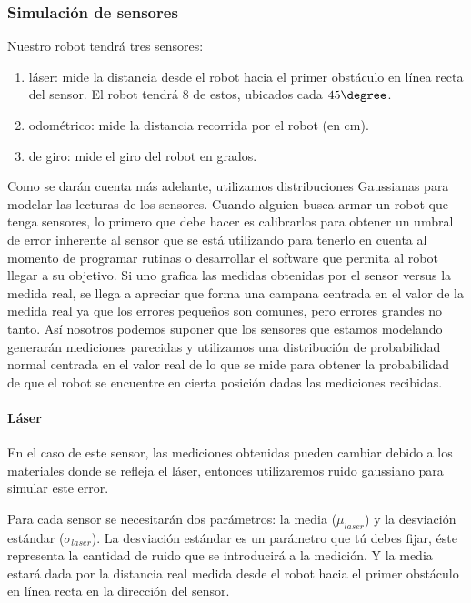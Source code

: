 \subsubsection{Simulación de sensores}

\noindent Nuestro robot tendrá tres sensores:

\begin{enumerate}
  \item láser: mide la distancia desde el robot hacia el primer obstáculo en línea recta del sensor. El robot tendrá 8 de estos, ubicados cada \(45\degree\).
  \item odométrico: mide la distancia recorrida por el robot (en cm).
  \item de giro: mide el giro del robot en grados.
\end{enumerate}

Como se darán cuenta más adelante, utilizamos distribuciones Gaussianas para modelar las lecturas de los sensores. Cuando alguien busca armar un robot que tenga sensores, lo primero que debe hacer es calibrarlos para obtener un umbral de error inherente al sensor que se está utilizando para tenerlo en cuenta al momento de programar rutinas o desarrollar el software que permita al robot llegar a su objetivo. Si uno grafica las medidas obtenidas por el sensor versus la medida real, se llega a apreciar que forma una campana centrada en el valor de la medida real ya que los errores pequeños son comunes, pero errores grandes no tanto. Así nosotros podemos suponer que los sensores que estamos modelando generarán mediciones parecidas y utilizamos una distribución de probabilidad normal centrada en el valor real de lo que se mide para obtener la probabilidad de que el robot se encuentre en cierta posición dadas las mediciones recibidas.

\paragraph{Láser}\medskip
En el caso de este sensor, las mediciones obtenidas pueden cambiar debido a los materiales donde se refleja el láser, entonces utilizaremos ruido gaussiano para simular este error.

Para cada sensor se necesitarán dos parámetros: la media (\( \mu_{laser} \)) y la desviación estándar (\( \sigma_{laser} \)). La desviación estándar es un parámetro que tú debes fijar, éste representa la cantidad de ruido que se introducirá a la medición. Y la media estará dada por la distancia real medida desde el robot hacia el primer obstáculo en línea recta en la dirección del sensor.

